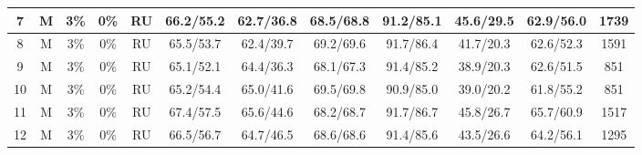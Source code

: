 \begin{table*}
{\begin{tabular}{|c|c|c|c|c||c|c|c|c|c|c||c|}
7 & M & 3\% & 0\% & RU & 66.2/55.2 & 62.7/36.8 & 68.5/68.8 & 91.2/85.1 & 45.6/29.5 & 62.9/56.0 & 1739 \\ \hline
8 & M & 3\% & 0\% & RU & 65.5/53.7 & 62.4/39.7 & 69.2/69.6 & 91.7/86.4 & 41.7/20.3 & 62.6/52.3 & 1591 \\ \hline
9 & M & 3\% & 0\% & RU & 65.1/52.1 & 64.4/36.3 & 68.1/67.3 & 91.4/85.2 & 38.9/20.3 & 62.6/51.5 & 851 \\ \hline
10 & M & 3\% & 0\% & RU & 65.2/54.4 & 65.0/41.6 & 69.5/69.8 & 90.9/85.0 & 39.0/20.2 & 61.8/55.2 & 851 \\ \hline
11 & M & 3\% & 0\% & RU & 67.4/57.5 & 65.6/44.6 & 68.2/68.7 & 91.7/86.7 & 45.8/26.7 & 65.7/60.9 & 1517 \\ \hline
12 & M & 3\% & 0\% & RU & 66.5/56.7 & 64.7/46.5 & 68.6/68.6 & 91.4/85.6 & 43.5/26.6 & 64.2/56.1 & 1295 \\ \hline
\end{tabular}}
\end{table*}



